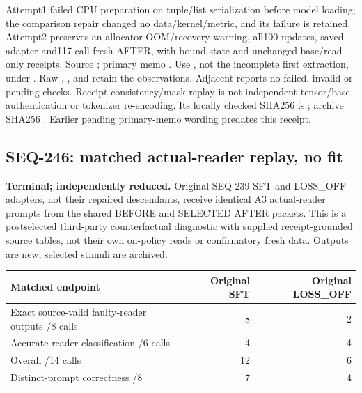 \documentclass[11pt]{article}
\begin{document}
Attempt1 failed CPU preparation on tuple/list serialization before model loading;
the comparison repair changed no data/kernel/metric, and its failure is retained.
Attempt2 preserves an allocator OOM/recovery warning, all100 updates, saved
adapter and117-call fresh AFTER, with bound state and unchanged-base/read-only
receipts. Source ; primary memo
.
Use , not the incomplete first extraction, under
.
Raw , , 
and  retain the observations.
Adjacent  reports no failed,
invalid or pending checks. Receipt consistency/mask replay is not independent
tensor/base authentication or tokenizer re-encoding. Its locally checked SHA256
is ;
archive SHA256 .
Earlier pending primary-memo wording predates this receipt.

\subsection{SEQ-246: matched actual-reader replay, no fit}
\label{sec:matched-reader-replay}

\textbf{Terminal; independently reduced.} Original SEQ-239 SFT and
LOSS\_OFF adapters, not their repaired descendants, receive identical A3
actual-reader prompts from the shared BEFORE and SELECTED AFTER packets.
This is a postselected third-party counterfactual diagnostic with supplied
receipt-grounded source tables, not their own on-policy reads or confirmatory
fresh data. Outputs are new; selected stimuli are archived.

\begin{center}
\small
\begin{tabular}{lrr}
\toprule
Matched endpoint & Original SFT & Original LOSS\_OFF \\
\midrule
Exact source-valid faulty-reader outputs /8 calls & 8 & 2 \\
Accurate-reader classification /6 calls & 4 & 4 \\
Overall /14 calls & 12 & 6 \\
Distinct-prompt correctness /8 & 7 & 4 \\
\bottomrule
\end{tabular}
\end{center}
\end{document}
